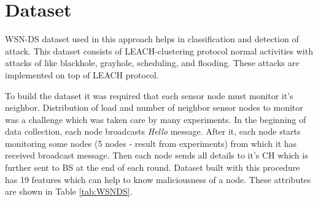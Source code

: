 \section{Dataset} \label{S5.3}
WSN-DS\cite{almomani2016wsn} dataset used in this approach helps in classification and detection of attack. This dataset consists of LEACH-clustering protocol normal activities with attacks of like blackhole, grayhole, scheduling, and flooding. These attacks are implemented on top of LEACH protocol.
\par
To build the dataset it was required that each sensor node must monitor it's neighbor. Distribution of load and number of neighbor sensor nodes to monitor was a challenge which was taken care by many experiments. In the beginning of data collection, each node broadcasts \textit{Hello} message. After it, each node starts monitoring some nodes (5 nodes - result from experiments) from which it has received broadcast message. Then each node sends all details to it's CH which is further sent to BS at the end of each round. Dataset built with this procedure has 19 features which can help to know maliciousness of a node. These attributes are shown in Table \ref{tab:WSNDS}.
